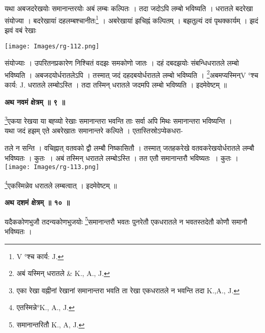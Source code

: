 \documentclass[11pt, openany]{book}
\begin{document}
 यथा अबजदरेखयोः समानान्तरयोः अबं लम्बः कल्पितः । तदा
जदोऽपि लम्बो भविष्यति । धरातले बदरेखा  संयोज्या । बदरेखायां दहलम्बश्चानीतः\renewcommand{\thefootnote}{१}\footnote{{\en V} °श्च कार्य: {\en J.}} ।  अबरेखायां झचिह्नं कल्पितम् । बझतुल्यं दवं पृथक्कार्यम् । झदं झवं वबं रेखाः 
\begin{center}
\texttt{[image: Images/rg-112.png]}
\end{center}
संयोज्याः । उपरितनप्रकारेण निश्चितं वदझः समकोणो जातः । दहं दबदझयोः संबन्धिधरातले लम्बो भविष्यति  । अबजदयोर्धरातलेऽपि । तस्मात् जदं दहदबयोर्धरातले लम्बो भविष्यति । \renewcommand{\thefootnote}{२}\footnote{अबं यस्मिन् धरातले {\en \& K., A., J.}}अबमप्यस्मिन्{\en V} °श्च कार्य: {\en J.} धरातले लम्बोऽस्ति । तदा तस्मिन् धरातले जदमपि लम्बो भविष्यति । इदमेवेष्टम् ॥\\
\begin{center}
\textbf{\large अथ नवमं क्षेत्रम् ॥ ९ ॥}
\end{center}
\vspace{2mm}

{\ab \renewcommand{\thefootnote}{३}\footnote{एका रेखा वह्नीनां रेखानां समानान्तरा भवति ता रेखा एकधरातले न भवन्ति तदा {\en K.,A., J.} 
}एकया रेखया या बह्व्यो रेखाः समानान्तरा भवन्ति ताः सर्वा अपि मिथः समानान्तरा भविष्यन्ति ।}\\

 यथा जदं हझम् एते अबरेखातः समानान्तरे कल्पिते  । एतास्तिस्रोऽप्येकधरा-
 \vspace{-2mm}
 
  \begin{vwcol}[widths={0.6,0.4}, sep=.8cm, rule=0pt] 
तले न सन्ति  । वचिह्नात् वतवको द्वौ लम्बौ निष्कासितौ  । तस्मात् जतहकरेखे वतवकरेखयोर्धरातले लम्बौ भविष्यतः  । कुतः~। अबं तस्मिन् धरातले
लम्बोऽस्ति । तत एतौ समानान्तरौ भविष्यतः~। कुतः ।\\
\noindent \texttt{[image: Images/rg-113.png]}
\end{vwcol}
\vspace{-6mm}

\noindent  \renewcommand{\thefootnote}{४}\footnote{एतस्मिन्ने°{\en K., A., J.}}एकस्मिन्नेव
\noindent धरातले लम्बत्वात्  । इदमेवेष्टम् ॥

\newpage
\begin{center}
\textbf{\large अथ दशमं क्षेत्रम् ॥ १० ॥}
\end{center}
\vspace{2mm}

{\ab यदैककोणभुजौ तदन्यकोणभुजयोः \renewcommand{\thefootnote}{१}\footnote{ समानान्तरितौ {\en K., A, J.}}समानान्तरौ भवतः पुनरेतौ एकधरातले न भवतस्तदेतौ कोणौ समानौ भविष्यतः  ।}\\
\vspace{3mm}
\end{document}
